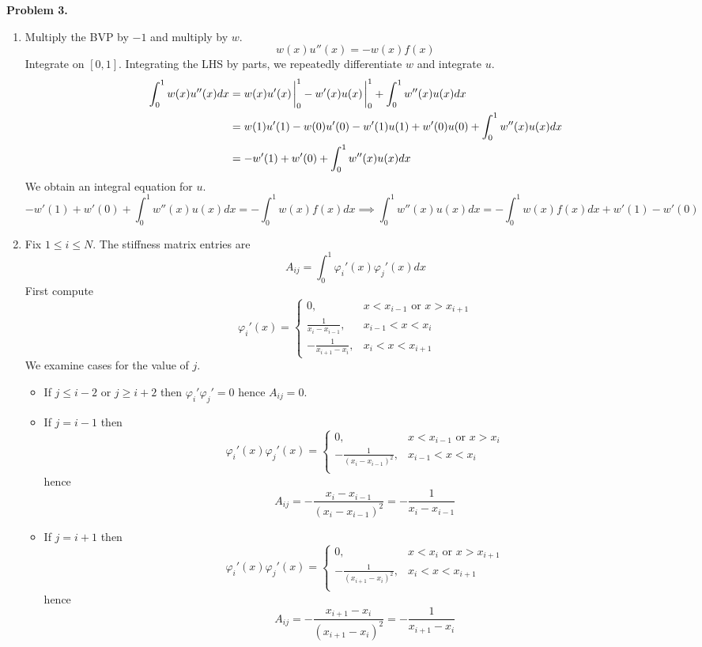 \documentclass{article}
\def\tbf#1{\textbf{#1}}
\newcommand{\vp}{\varphi}
\newcommand{\imp}{\implies}
\begin{document}
\tbf{Problem 3.}

\begin{enumerate}[label=(\alph*)]
	
\item Multiply the BVP by $-1$ and multiply by $w$.
$$w(x)u''(x) = -w(x)f(x)$$
Integrate on $[0,1]$. Integrating the LHS by parts, we repeatedly differentiate $w$ and integrate $u$.
\begin{align*}
	\int_0^1 w(x)u''(x)dx &= w(x)u'(x)\eval_0^1 - w'(x)u(x)\eval_0^1 + \int_0^1 w''(x)u(x)dx\\
	&= w(1)u'(1) - w(0)u'(0) - w'(1)u(1) + w'(0)u(0) + \int_0^1 w''(x)u(x)dx\\
	&= -w'(1) + w'(0) + \int_0^1 w''(x)u(x)dx
\end{align*}
We obtain an integral equation for $u$.
$$-w'(1) + w'(0) + \int_0^1 w''(x)u(x)dx = -\int_0^1 w(x)f(x)dx
\imp \int_0^1 w''(x)u(x)dx = -\int_0^1 w(x)f(x)dx + w'(1) - w'(0)$$


\item Fix $1\le i\le N$. The stiffness matrix entries are
$$A_{ij} = \int_0^1\vp_i'(x)\vp_j'(x)dx$$
First compute
$$\vp_i'(x) =
\begin{cases}
	0, & x<x_{i-1} \text{ or } x>x_{i+1}\\
	\frac{1}{x_i-x_{i-1}}, & x_{i-1}<x<x_i\\
	-\frac{1}{x_{i+1}-x_i}, & x_i<x<x_{i+1}
\end{cases}$$
We examine cases for the value of $j$.

\begin{itemize}
	
	\item If $j\le i-2$ or $j\ge i+2$ then $\vp_i'\vp_j'=0$ hence $A_{ij}=0$.
	
	\item If $j=i-1$ then
	$$\vp_i'(x)\vp_j'(x) =
	\begin{cases}
		0, & x< x_{i-1} \text{ or } x> x_i\\
		-\frac{1}{(x_i-x_{i-1})^2}, & x_{i-1}<x<x_i\\
	\end{cases}$$
	hence
	$$A_{ij} = -\frac{x_i-x_{i-1}}{(x_i-x_{i-1})^2} = -\frac{1}{x_i-x_{i-1}}$$
	
	\item If $j=i+1$ then
	$$\vp_i'(x)\vp_j'(x) =
	\begin{cases}
		0, & x< x_i \text{ or } x> x_{i+1}\\
		-\frac{1}{(x_{i+1}-x_{i})^2}, & x_i<x<x_{i+1}\\
	\end{cases}$$
	hence
	$$A_{ij} = -\frac{x_{i+1}-x_i}{(x_{i+1}-x_{i})^2} = -\frac{1}{x_{i+1}-x_{i}}$$
	

\end{itemize}
\end{enumerate}
\end{document}
